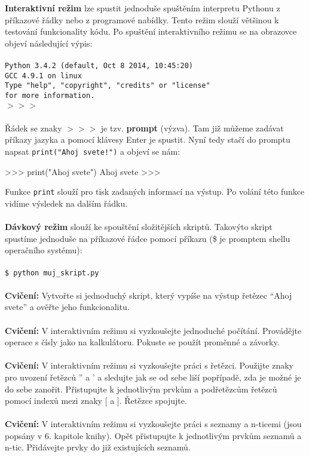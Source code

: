 {\textbf{Interaktivní režim}} lze spustit jednoduše spuštěním interpretu Pythonu z příkazové řádky nebo z programové nabídky. Tento režim slouží většinou k testování funkcionality kódu. Po spuštění interaktivního režimu se na obrazovce objeví následující výpis:
\\
\\
\noindent
{\texttt{Python 3.4.2 (default, Oct  8 2014, 10:45:20) \\
GCC 4.9.1 on linux\\
Type "help", "copyright", "credits" or "license"\\
for more information.\\
$>>>$
}}
\\
\\
\noindent
Řádek se znaky {\texttt{$>>>$}} je tzv. \textbf{prompt} (výzva). Tam již můžeme zadávat příkazy jazyka a pomocí klávesy Enter je spustit.
Nyní tedy stačí do promptu napsat {\texttt{print("Ahoj svete!")}} a objeví se nám:

\begin{python}
>>> print("Ahoj svete")
Ahoj svete
>>> 
\end{python}

\noindent
Funkce {\texttt{print}} slouží pro tisk zadaných informací na výstup. Po volání této funkce vidíme výsledek na dalším řádku.
\\
\\
\noindent
{\textbf{Dávkový režim}} slouží ke spouštění složitějších skriptů. Takovýto skript spustíme jednoduše na příkazové řádce pomocí příkazu (\$ je promptem shellu operačního systému):
\\
\\
\noindent
{\texttt{\$ python muj\_skript.py}}
\\
\\
\noindent
{\textbf{Cvičení:}}
Vytvořte si jednoduchý skript, který vypíše na výstup řetězec ``Ahoj svete'' a ověřte jeho funkcionalitu.
\\
\\
\noindent
{\textbf{Cvičení:}}
V interaktivním režimu si vyzkoušejte jednoduché počítání. Provádějte operace s čísly jako na kalkulátoru. Pokuste se použít proměnné a závorky.
\\
\\
\noindent
{\textbf{Cvičení:}}
V interaktivním režimu si vyzkoušejte práci s řetězci. Použijte znaky pro uvození řetězců '' a ' a sledujte jak se od sebe liší popřípadě, zda je možné je do sebe zanořit. Přistupujte k jednotlivým prvkům a podřetězcům řetězců pomocí indexů mezi znaky $[$ a $]$. Řetězce spojujte.
\\
\\
\noindent
{\textbf{Cvičení:}}
V interaktivním režimu si vyzkoušejte práci s seznamy a n-ticemi (jsou popsány v 6. kapitole knihy). Opět přistupujte k jednotlivým prvkům seznamů a n-tic. Přidávejte prvky do již existujících seznamů.

